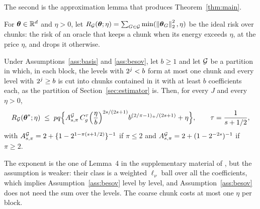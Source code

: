 The second is the approximation lemma that produces Theorem~\ref{thm:main}.

For $\boldsymbol{\theta} \in \mathbb{R}^{d}$ and $\eta > 0$, let
$R_{\mathcal{G}}(\boldsymbol{\theta};\eta) = \sum_{G\in\mathcal{G}}\min(\left\lVert \boldsymbol{\theta}_{G} \right\rVert_{2}^{2},\eta)$
be the ideal risk over chunks: the risk of an oracle that keeps a chunk when
its energy exceeds $\eta$, at the price $\eta$, and drops it otherwise.



\begin{lemma}
\label{lem:weak}
Under Assumptions~\ref{ass:basis} and \ref{ass:besov}, let $b \ge 1$ and let
$\mathcal{G}$ be a partition in which, in each block, the levels with $2^{j} < b$
form at most one chunk and every level with $2^{j} \ge b$ is cut into
chunks contained in it with at least $b$ coefficients each, as the partition of
Section~\ref{sec:estimator} is. Then, for every $J$ and every $\eta > 0$,
\[
  R_{\mathcal{G}}(\boldsymbol{\theta}^{*};\eta) \;\le\; pq\Bigl\{A^{\mathcal{G}}_{s,\pi}\,C_g^{\tau}
  \Bigl(\frac{\eta}{b}\Bigr)^{2s/(2s+1)}b^{(2/\pi-1)_{+}/(2s+1)} + \eta\Bigr\},
  \qquad \tau = \frac{1}{s+1/2},
\]
with $A^{\mathcal{G}}_{s,\pi} = 2 + \{1-2^{1-\pi(s+1/2)}\}^{-1}$ if $\pi \le 2$ and
$A^{\mathcal{G}}_{s,\pi} = 2 + (1-2^{-2s})^{-1}$ if $\pi \ge 2$.
\end{lemma}



The exponent is the one of Lemma~4 in the supplementary material
of \citet{Klopp-Pensky-2015}, but the assumption is weaker: their class is a
weighted $\ell_\nu$ ball over all the coefficients, which implies
Assumption~\ref{ass:besov} level by level, and Assumption~\ref{ass:besov} does
not need the sum over the levels. The coarse chunk costs at most one $\eta$
per block.




